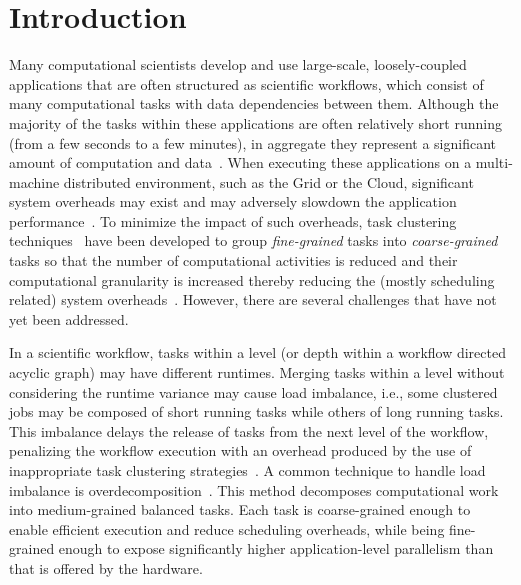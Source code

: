 \documentclass[final]{IEEEtran}
\begin{document}
\IEEEpeerreviewmaketitle


\section{Introduction}

Many computational scientists develop and use large-scale, loosely-coupled applications that are often structured as scientific workflows, which consist of many computational tasks with data dependencies between them. Although the majority of the tasks within these applications are often relatively short running (from a few seconds to a few minutes), in aggregate they represent a significant amount of computation and data~\cite{LIGO}. When executing these applications on a multi-machine distributed environment, such as the Grid or the Cloud, significant system overheads may exist and may adversely slowdown the application performance~\cite{Chen}. To minimize the impact of such overheads, task clustering techniques~\cite{Muthuvelu:2005:DJG:1082290.1082297,4493929,Muthuvelu2010,Muthuvelu2013170,keat-2006,ang-2009,4958835,Singh:2008:WTC:1341811.1341822,europar-granularity} have been developed to group \emph{fine-grained} tasks into \emph{coarse-grained} tasks so that the number of computational activities is reduced and their computational granularity is increased thereby reducing the (mostly scheduling related) system overheads~\cite{Chen}.
However, there are several challenges that have not yet been addressed.

In a scientific workflow, tasks within a level (or depth within a workflow directed acyclic graph) may have different runtimes. Merging tasks within a level without considering the runtime variance may cause load imbalance, i.e., some clustered jobs may be composed of short running tasks while others of long running tasks. This imbalance delays the release of tasks from the next level of the workflow, penalizing the workflow execution with an overhead produced by the use of inappropriate task clustering strategies~\cite{Chen2013}.
A common technique to handle load imbalance is overdecomposition~\cite{Lifflander}.
This method decomposes computational work into medium-grained balanced tasks. Each task is coarse-grained enough to enable efficient execution and reduce scheduling overheads, while being fine-grained enough to expose significantly higher application-level parallelism than that is offered by the hardware. 
\end{document}
